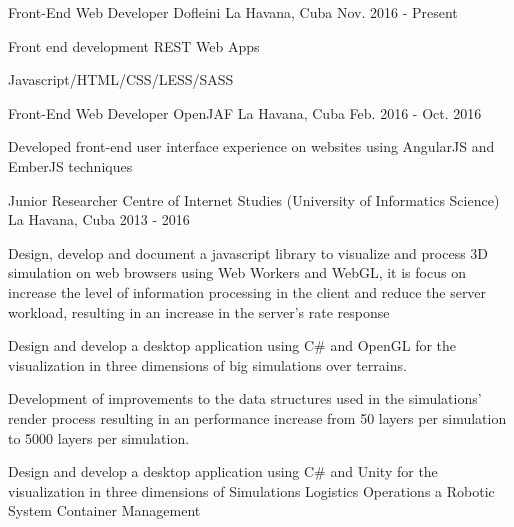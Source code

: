 


\begin{cventries}


\cventry
{Front-End Web Developer} %
{Dofleini} %
{La Havana, Cuba} %
{Nov. 2016 - Present} %
{ %
\begin{cvitems}
\item {Front end development REST Web Apps}
\item {Javascript/HTML/CSS/LESS/SASS}
\end{cvitems}
}

\cventry
{Front-End Web Developer} %
{OpenJAF} %
{La Havana, Cuba} %
{Feb. 2016 - Oct. 2016} %
{ %
\begin{cvitems}
\item {Developed front-end user interface experience on websites using AngularJS and EmberJS techniques}
\end{cvitems}
}

\cventry
{Junior Researcher} %
{Centre of Internet Studies (University of Informatics Science)} %
{La Havana, Cuba} %
{2013 - 2016} %
{ %
\begin{cvitems}
\item {Design, develop and document a javascript library to visualize and process 3D simulation on web browsers using Web Workers and WebGL, it is focus on increase the level of information processing in the client and reduce the server workload, resulting in an increase in the server's rate response}
\item {Design and develop a desktop application using C# and OpenGL for the visualization in three dimensions of big simulations over terrains.}
\item {Development of improvements to the data structures used in the simulations' render process resulting in an performance increase from 50 layers per simulation to 5000 layers per simulation.}
\item {Design and develop a desktop application using C# and Unity for the visualization in three dimensions of Simulations Logistics Operations a Robotic System Container Management}
\end{cvitems} 
}



\end{cventries}
